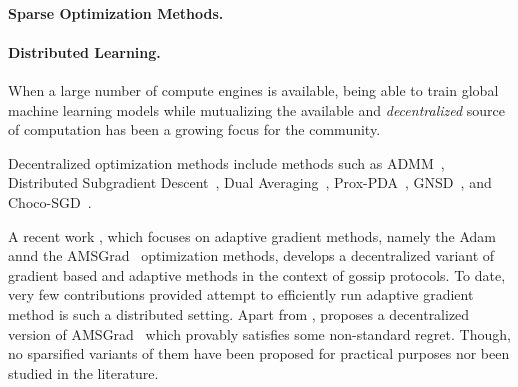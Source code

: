 \documentclass[11pt]{article}
\begin{document}
\paragraph{Sparse Optimization Methods. } 


\paragraph{Distributed Learning. }
When a large number of compute engines is available, being able to train global machine learning models while mutualizing the available and \emph{decentralized} source of computation has been a growing focus for the community.

Decentralized optimization methods include methods such as ADMM~\citep{boyd2011distributed}, Distributed Subgradient Descent~\citep{nedic2009distributed}, Dual Averaging~\citep{duchi2011dual}, Prox-PDA~\citep{hong2017prox}, GNSD~\citep{lu2019gnsd}, and Choco-SGD~\citep{koloskova2019decentralized}.  

A recent work \citep{chen2020quantized}, which focuses on adaptive gradient methods, namely the Adam \citep{kingma2014adam} annd the  AMSGrad~\citep{reddi2019convergence} optimization methods, develops a decentralized variant of gradient based and adaptive methods in the context of gossip protocols.
To date, very few contributions provided attempt to efficiently run adaptive gradient method is such a distributed setting.
Apart from \citep{chen2020quantized}, \citet{nazari2019dadam} proposes a decentralized version of AMSGrad~\citep{reddi2019convergence} which provably satisfies some non-standard regret.
Though, no sparsified variants of them have been proposed for practical purposes nor been studied in the literature.
\end{document}
